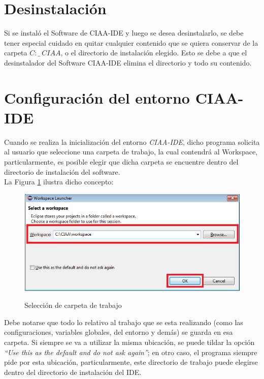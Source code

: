 \documentclass[12pt,letterpaper]{article}
\begin{document}
\section{Desinstalación}
Si se instaló el Software de CIAA-IDE y luego se desea desinstalarlo, se debe tener especial
cuidado en quitar cualquier contenido que se quiera conservar de la carpeta $C:\_\ CIAA$, o el
directorio de instalación elegido. Esto se debe a que el desinstalador del Software CIAA-IDE
elimina el directorio y todo su contenido.

\section{Configuración del entorno CIAA-IDE}
Cuando se realiza la inicialización del entorno \textit{CIAA-IDE}, dicho programa solicita al usuario que seleccione una carpeta de trabajo, la cual contendrá al Workspace, particularmente, es posible elegir que dicha carpeta se encuentre dentro del directorio de instalación del software.\\
La Figura \ref{config1} ilustra dicho concepto:

\begin{center}
\begin{figure}[!h]
\centering
\includegraphics[width=8 cm]{figuras/configuracion1.png}\\
\caption{Selección de carpeta de trabajo}
\label{config1}
\end{figure}
\end{center}

Debe notarse que todo lo relativo al trabajo que se esta realizando (como las configuraciones, variables globales, del entorno y demás) se guarda en esa carpeta. Si siempre se va a utilizar la misma ubicación, se
puede tildar la opción \textit{“Use this as the default and do not ask again”}; en otro caso, el programa siempre pide por esta ubicación, particularmente, este directorio de trabajo puede elegirse dentro del directorio de instalación del IDE.
\end{document}
